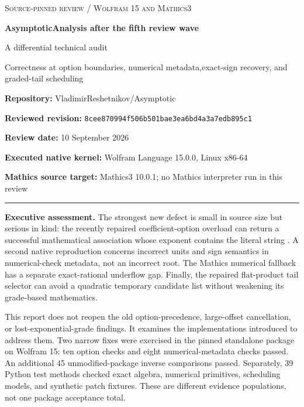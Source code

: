 \documentclass[11pt,letterpaper]{article}
\newcommand{\code}[1]{\texttt{\detokenize{#1}}}
\newcommand{\pin}{\texttt{8cee870994f506b501bae3ea6bd4a3a7edb895c1}}
\begin{document}
\thispagestyle{empty}
{\small\scshape\color{muted}Source-pinned review \quad / \quad Wolfram 15 and Mathics3}
\vspace{0.35in}

{\LARGE\bfseries\color{ink}AsymptoticAnalysis after the fifth review wave}\par
\vspace{0.12in}
{\Large A differential technical audit}\par
\vspace{0.2in}
{\large Correctness at option boundaries, numerical metadata,\newline exact-sign recovery, and graded-tail scheduling}\par
\vspace{0.22in}
\textbf{Repository:} VladimirReshetnikov/Asymptotic\par
\textbf{Reviewed revision:} \pin\par
\textbf{Review date:} 10 September 2026\par
\textbf{Executed native kernel:} Wolfram Language 15.0.0, Linux x86-64\par
\textbf{Mathics source target:} Mathics3 10.0.1; no Mathics interpreter run in this review

\vspace{0.18in}
\hrule
\vspace{0.15in}
\textbf{Executive assessment.}
The strongest new defect is small in source size but serious in kind: the recently repaired coefficient-option overload can return a successful mathematical association whose exponent contains the literal string \code{"Power"}. A second native reproduction concerns incorrect units and sign semantics in numerical-check metadata, not an incorrect root. The Mathics numerical fallback has a separate exact-rational underflow gap. Finally, the repaired flat-product tail selector can avoid a quadratic temporary candidate list without weakening its grade-based mathematics.

This report does not reopen the old option-precedence, large-offset cancellation, or lost-exponential-grade findings. It examines the implementations introduced to address them. Two narrow fixes were exercised in the pinned standalone package on Wolfram 15: ten option checks and eight numerical-metadata checks passed. An additional 45 unmodified-package inverse comparisons passed. Separately, 39 Python test methods checked exact algebra, numerical primitives, scheduling models, and synthetic patch fixtures. These are different evidence populations, not one package acceptance total.
\end{document}
